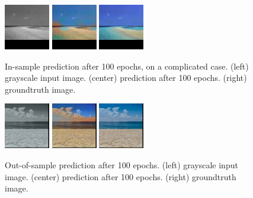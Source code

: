 \documentclass[10pt,twocolumn,letterpaper]{article}
\begin{document}

\begin{figure}
\includegraphics[width=75px]{img/grayscaleis.png}
\includegraphics[width=75px]{img/100epochis.png}
\includegraphics[width=75px]{img/grndtruthis.png}
\caption{In-sample prediction after 100 epochs, on a complicated case. (left) grayscale input image. (center) prediction after 100 epochs. (right) groundtruth image.}
\label{is}
\end{figure}

\begin{figure}
\includegraphics[width=75px]{img/grayscaleoos.png}
\includegraphics[width=75px]{img/100epochoos.png}
\includegraphics[width=75px]{img/grndtruthoos.png}
\caption{Out-of-sample prediction after 100 epochs. (left) grayscale input image. (center) prediction after 100 epochs. (right) groundtruth image.}
\label{oos}
\end{figure}
\end{document}
